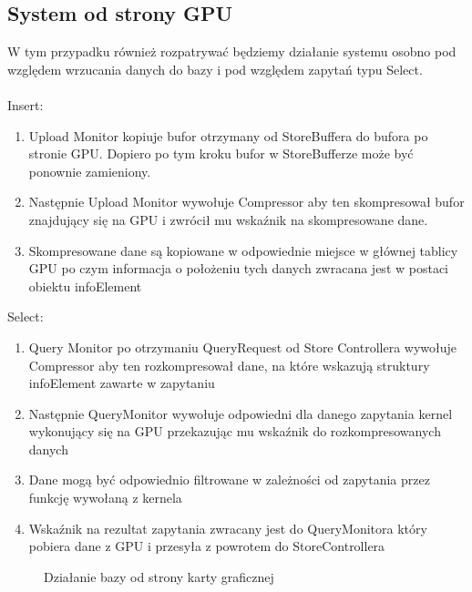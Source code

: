 \documentclass[paper=a4, fontsize=11pt]{scrartcl} %
\numberwithin{equation}{section} %
\numberwithin{figure}{section} %
\numberwithin{table}{section} %
\begin{document}
	\subsection{System od strony GPU}
		W tym przypadku również rozpatrywać będziemy działanie systemu osobno pod względem wrzucania danych do bazy i pod względem zapytań typu Select. \\ \\
		Insert: \\
		\begin{enumerate}
			\item Upload Monitor kopiuje bufor otrzymany od StoreBuffera do bufora po stronie GPU. Dopiero po tym kroku bufor w StoreBufferze może być ponownie zamieniony.
			\item Następnie Upload Monitor wywołuje Compressor aby ten skompresował bufor znajdujący się na GPU i zwrócił mu wskaźnik na skompresowane dane.
			\item Skompresowane dane są kopiowane w odpowiednie miejsce w głównej tablicy GPU po czym informacja o położeniu tych danych zwracana jest w postaci 
				obiektu infoElement
		\end{enumerate}
		Select: \\
		\begin{enumerate}
			\item Query Monitor po otrzymaniu QueryRequest od Store Controllera wywołuje Compressor aby ten rozkompresował dane, na które wskazują struktury infoElement zawarte w zapytaniu
			\item Następnie QueryMonitor wywołuje odpowiedni dla danego zapytania kernel wykonujący się na GPU przekazując mu wskaźnik do rozkompresowanych danych 
			\item Dane mogą być odpowiednio filtrowane w zależności od zapytania przez funkcję wywołaną z kernela
			\item Wskaźnik na rezultat zapytania zwracany jest do QueryMonitora który pobiera dane z GPU i przesyła z powrotem do StoreControllera
		\end{enumerate}
		\begin{figure}[t]
			\begin{center}
				\caption{Działanie bazy od strony karty graficznej}
			\end{center}
		\end{figure}
\end{document}
